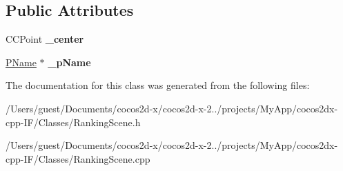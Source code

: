 \subsection*{Public Attributes}
\begin{DoxyCompactItemize}
\item 
\hypertarget{class_ranking_layer_afaf10128b02c964fd35dab8282dac515}{C\-C\-Point {\bfseries \-\_\-center}}\label{class_ranking_layer_afaf10128b02c964fd35dab8282dac515}

\item 
\hypertarget{class_ranking_layer_acf0824c7f6468f8ace8a6b71e5185bb6}{\hyperlink{class_p_name}{P\-Name} $\ast$ {\bfseries \-\_\-p\-Name}}\label{class_ranking_layer_acf0824c7f6468f8ace8a6b71e5185bb6}

\end{DoxyCompactItemize}


The documentation for this class was generated from the following files\-:\begin{DoxyCompactItemize}
\item 
/\-Users/guest/\-Documents/cocos2d-\/x/cocos2d-\/x-\/2../projects/\-My\-App/cocos2dx-\/cpp-\/\-I\-F/\-Classes/Ranking\-Scene.\-h\item 
/\-Users/guest/\-Documents/cocos2d-\/x/cocos2d-\/x-\/2../projects/\-My\-App/cocos2dx-\/cpp-\/\-I\-F/\-Classes/Ranking\-Scene.\-cpp\end{DoxyCompactItemize}
